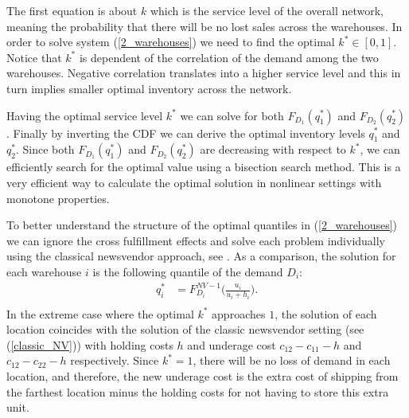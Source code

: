\documentclass[poms,final,blindrev]{poms1_V1} %
\begin{document}
The first equation is about $k$ which is the service level of the overall network, meaning the probability that there will be no lost sales across the warehouses.
In order to solve system (\ref{2_warehouses}) we need to find the optimal $k^* \in [0,1]$. Notice that $k^*$ is dependent of the correlation of the demand among the two warehouses. Negative correlation translates into a higher service level and this in turn implies smaller optimal inventory across the network.

Having the optimal service level $k^*$ we can solve for both $F_{D_1}(q^*_1)$ and $F_{D_2}(q^*_2)$. Finally by inverting the CDF we can derive the optimal inventory levels $q^*_1$ and $q^*_2$.
Since both $F_{D_1}(q^*_1)$ and $F_{D_2}(q^*_2)$ are decreasing with respect to $k^*$, we can efficiently search for the optimal value using a bisection search method. This is a very efficient way to calculate the optimal solution in nonlinear settings with monotone properties. 


To better understand the structure of the optimal quantiles in (\ref{2_warehouses}) we can ignore the cross fulfillment effects and solve each problem individually using the classical newsvendor approach, see \cite{arrow1951optimal}. As a comparison, the solution for each warehouse $i$ is the following quantile of the demand $D_i$:
\begin{equation}
\begin{aligned}
\label{classic_NV}
q^*_i &=  F^{NV-1}_{D_i} \Big( \frac{u_i }{ u_i+ h_i  }\Big).\\
\end{aligned}
\end{equation} 
In the extreme case where the optimal $k^*$ approaches $1$, the solution of each  location coincides with the solution of the classic newsvendor setting (see (\ref{classic_NV})) with holding costs $h$ and underage cost $c_{12} - c_{11} - h$ and $c_{12} - c_{22} - h$ respectively. Since $k^*=1$, there will be no loss of demand in each location, and therefore, the new underage cost is the extra cost of shipping from the farthest location minus the holding costs for not having to store this extra unit.

\end{document}
